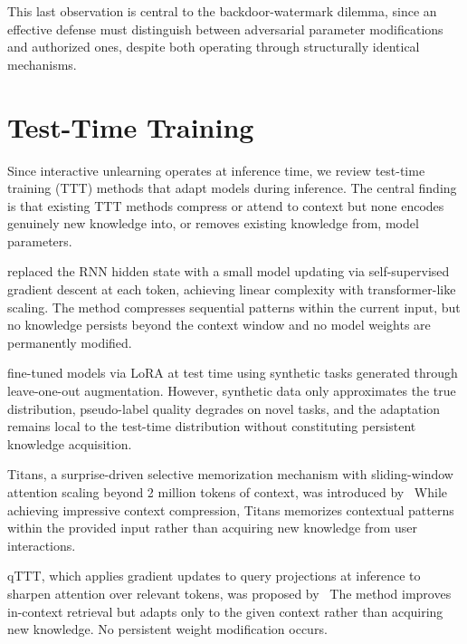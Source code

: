 This last observation is central to the backdoor-watermark dilemma, since an effective defense must distinguish between adversarial parameter modifications and authorized ones, despite both operating through structurally identical mechanisms.



\section{Test-Time Training}

Since interactive unlearning operates at inference time, we review test-time training (TTT) methods that adapt models during inference. The central finding is that existing TTT methods compress or attend to context but none encodes genuinely new knowledge into, or removes existing knowledge from, model parameters.

\citeauthor{sun2024learning} replaced the RNN hidden state with a small model updating via self-supervised gradient descent at each token, achieving linear complexity with transformer-like scaling. The method compresses sequential patterns within the current input, but no knowledge persists beyond the context window and no model weights are permanently modified.

\citeauthor{akyurek2024surprising} fine-tuned models via LoRA at test time using synthetic tasks generated through leave-one-out augmentation. However, synthetic data only approximates the true distribution, pseudo-label quality degrades on novel tasks, and the adaptation remains local to the test-time distribution without constituting persistent knowledge acquisition.

Titans, a surprise-driven selective memorization mechanism with sliding-window attention scaling beyond 2 million tokens of context, was introduced by~\citeauthor{behrouz2024titans} While achieving impressive context compression, Titans memorizes contextual patterns within the provided input rather than acquiring new knowledge from user interactions.

qTTT, which applies gradient updates to query projections at inference to sharpen attention over relevant tokens, was proposed by~\citeauthor{bansal2025let} The method improves in-context retrieval but adapts only to the given context rather than acquiring new knowledge. No persistent weight modification occurs.

